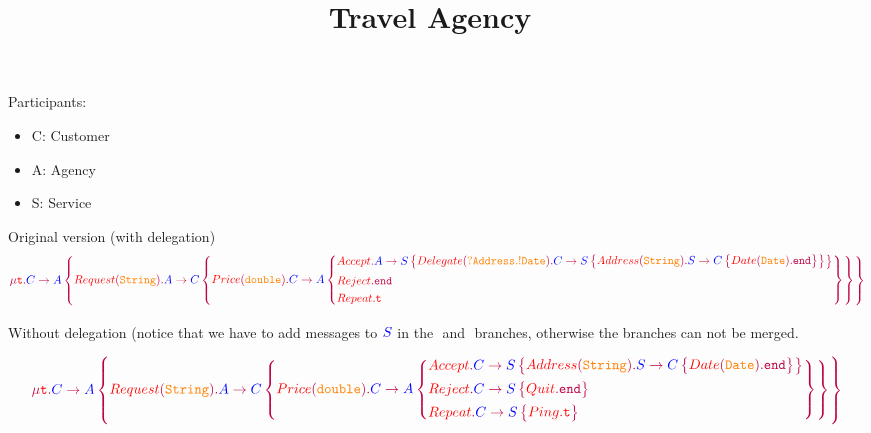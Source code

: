 \documentclass{article}
\title{Travel Agency~\cite{HuSessionBased2008}}
\date{}
\begin{document}
	\maketitle

	Participants:
	\begin{itemize}
		\item C: Customer
		\item A: Agency
		\item S: Service
	\end{itemize}

Original version (with delegation)
	$$
	\gtRec{t}{
		\gtComm{C}{A}{
			{{Request}[String]{
					\gtComm{A}{C}{
						{{Price}[double]{
								\gtComm{C}{A}{
									{{Accept}{\gtComm{A}{S}{
												{{Delegate}[?Address.!Date]{
														\gtComm{C}{S}{
															{{Address}[String]{
																	\gtComm{S}{C}{
																	{{Date}[Date]{\gtEnd}}
																}
															}}
														}
												}}
									}}}
									{{Reject}{\gtEnd}}
									{{Repeat}{\gtVar{t}}}
								}
						}}
					}
			}}
		}
	}
	$$

Without delegation (notice that we have to add messages to ${\color{blue} S}$
in the $\label{Reject}$ and $\label{Repeat}$ branches, otherwise the branches
can not be merged.

	$$
\gtRec{t}{
	\gtComm{C}{A}{
		{{Request}[String]{
				\gtComm{A}{C}{
					{{Price}[double]{
							\gtComm{C}{A}{
								{{Accept}{
										\gtComm{C}{S}{
											{{Address}[String]{
													\gtComm{S}{C}{
														{{Date}[Date]{\gtEnd}}
													}
											}}
										}
									}}
								{{Reject}{\gtComm{C}{S}{
											{{Quit}{\gtEnd}}
								}}}
								{{Repeat}{\gtComm{C}{S}{
											{{Ping}{\gtVar{t}}}
										}
								}}
							}
					}}
				}
		}}
	}
}
$$

	
	
\end{document}

